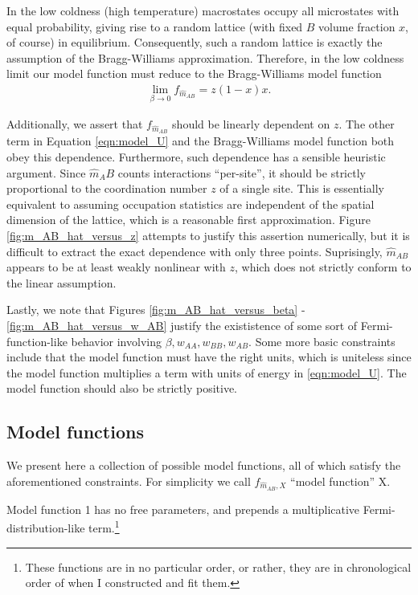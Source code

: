 \documentclass[10pt]{article}
\begin{document}
In the low coldness (high temperature) macrostates occupy all microstates with equal probability, giving rise to a random lattice (with fixed $B$ volume fraction $x$, of course) in equilibrium.
Consequently, such a random lattice is exactly the assumption of the Bragg-Williams approximation.
Therefore, in the low coldness limit our model function must reduce to the Bragg-Williams model function
\begin{align}
    \lim_{\beta \rightarrow 0} f_{\hat{m}_{AB}} = z (1-x) x.
\end{align}

Additionally, we assert that $f_{\hat{m}_{AB}}$ should be linearly dependent on $z$.
The other term in Equation \ref{eqn:model_U} and the Bragg-Williams model function both obey this dependence.
Furthermore, such dependence has a sensible heuristic argument.
Since $\hat{m}_AB$ counts interactions ``per-site'', it should be strictly proportional to the coordination number $z$ of a single site.
This is essentially equivalent to assuming occupation statistics are independent of the spatial dimension of the lattice, which is a reasonable first approximation.
Figure \ref{fig:m_AB_hat_versus_z} attempts to justify this assertion numerically, but it is difficult to extract the exact dependence with only three points.
Suprisingly, $\hat{m}_{AB}$ appears to be at least weakly nonlinear with $z$, which does not strictly conform to the linear assumption.

Lastly, we note that Figures \ref{fig:m_AB_hat_versus_beta} - \ref{fig:m_AB_hat_versus_w_AB} justify the exististence of some sort of Fermi-function-like behavior involving $\beta,w_{AA},w_{BB},w_{AB}$.
Some more basic constraints include that the model function must have the right units, which is uniteless since the model function multiplies a term with units of energy in \ref{eqn:model_U}.
The model function should also be strictly positive.

\subsection{Model functions}
We present here a collection of possible model functions, all of which satisfy the aforementioned constraints.
For simplicity we call $f_{\hat{m}_{AB},X}$ ``model function'' X.

Model function 1 has no free parameters, and prepends a multiplicative Fermi-distribution-like term.\footnote{These functions are in no particular order, or rather, they are in chronological order of when I constructed and fit them.}
\end{document}
